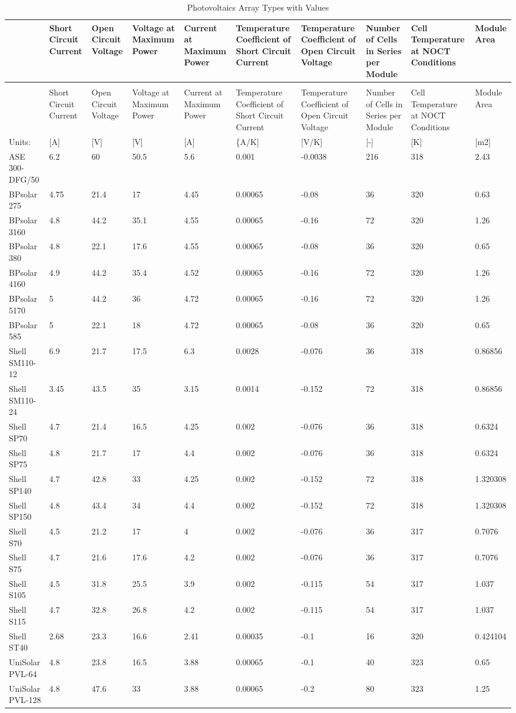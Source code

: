 \begin{longtable}[c]{p{0.6in}p{0.6in}p{0.6in}p{0.6in}p{0.6in}p{0.6in}p{0.6in}p{0.6in}p{0.6in}p{0.6in}}
\caption{Photovoltaics Array Types with Values \label{table:photovoltaics-array-types-with-values}} \tabularnewline
\toprule
 & Short Circuit Current & Open Circuit Voltage & Voltage at Maximum Power & Current at Maximum Power & Temperature Coefficient of Short Circuit Current & Temperature Coefficient of Open Circuit Voltage & Number of Cells in Series per Module & Cell Temperature at NOCT Conditions & Module Area \tabularnewline
\midrule
\endfirsthead

\caption[]{Photovoltaics Array Types with Values} \tabularnewline
\toprule
 & Short Circuit Current & Open Circuit Voltage & Voltage at Maximum Power & Current at Maximum Power & Temperature Coefficient of Short Circuit Current & Temperature Coefficient of Open Circuit Voltage & Number of Cells in Series per Module & Cell Temperature at NOCT Conditions & Module Area \tabularnewline
\midrule
\endhead

Units: & [A] & [V] & [V] & [A] & \{A/K] & [V/K] & [-] & [K] & [m2] \tabularnewline
ASE 300-DFG/50 & 6.2 & 60 & 50.5 & 5.6 & 0.001 & -0.0038 & 216 & 318 & 2.43 \tabularnewline
BPsolar 275 & 4.75 & 21.4 & 17 & 4.45 & 0.00065 & -0.08 & 36 & 320 & 0.63 \tabularnewline
BPsolar 3160 & 4.8 & 44.2 & 35.1 & 4.55 & 0.00065 & -0.16 & 72 & 320 & 1.26 \tabularnewline
BPsolar 380 & 4.8 & 22.1 & 17.6 & 4.55 & 0.00065 & -0.08 & 36 & 320 & 0.65 \tabularnewline
BPsolar 4160 & 4.9 & 44.2 & 35.4 & 4.52 & 0.00065 & -0.16 & 72 & 320 & 1.26 \tabularnewline
BPsolar 5170 & 5 & 44.2 & 36 & 4.72 & 0.00065 & -0.16 & 72 & 320 & 1.26 \tabularnewline
BPsolar 585 & 5 & 22.1 & 18 & 4.72 & 0.00065 & -0.08 & 36 & 320 & 0.65 \tabularnewline
Shell SM110-12 & 6.9 & 21.7 & 17.5 & 6.3 & 0.0028 & -0.076 & 36 & 318 & 0.86856 \tabularnewline
Shell SM110-24 & 3.45 & 43.5 & 35 & 3.15 & 0.0014 & -0.152 & 72 & 318 & 0.86856 \tabularnewline
Shell SP70 & 4.7 & 21.4 & 16.5 & 4.25 & 0.002 & -0.076 & 36 & 318 & 0.6324 \tabularnewline
Shell SP75 & 4.8 & 21.7 & 17 & 4.4 & 0.002 & -0.076 & 36 & 318 & 0.6324 \tabularnewline
Shell SP140 & 4.7 & 42.8 & 33 & 4.25 & 0.002 & -0.152 & 72 & 318 & 1.320308 \tabularnewline
Shell SP150 & 4.8 & 43.4 & 34 & 4.4 & 0.002 & -0.152 & 72 & 318 & 1.320308 \tabularnewline
Shell S70 & 4.5 & 21.2 & 17 & 4 & 0.002 & -0.076 & 36 & 317 & 0.7076 \tabularnewline
Shell S75 & 4.7 & 21.6 & 17.6 & 4.2 & 0.002 & -0.076 & 36 & 317 & 0.7076 \tabularnewline
Shell S105 & 4.5 & 31.8 & 25.5 & 3.9 & 0.002 & -0.115 & 54 & 317 & 1.037 \tabularnewline
Shell S115 & 4.7 & 32.8 & 26.8 & 4.2 & 0.002 & -0.115 & 54 & 317 & 1.037 \tabularnewline
Shell ST40 & 2.68 & 23.3 & 16.6 & 2.41 & 0.00035 & -0.1 & 16 & 320 & 0.424104 \tabularnewline
UniSolar PVL-64 & 4.8 & 23.8 & 16.5 & 3.88 & 0.00065 & -0.1 & 40 & 323 & 0.65 \tabularnewline
UniSolar PVL-128 & 4.8 & 47.6 & 33 & 3.88 & 0.00065 & -0.2 & 80 & 323 & 1.25 \tabularnewline
\bottomrule
\end{longtable}

